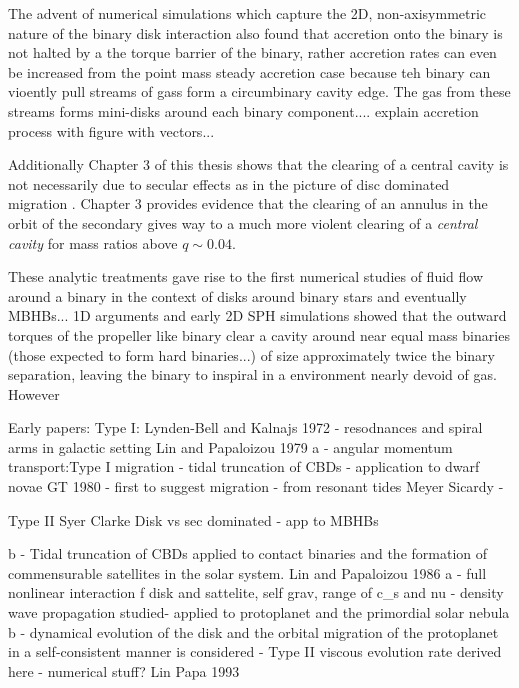 The advent of numerical simulations which capture the 2D, non-axisymmetric
nature of the binary disk interaction also found that accretion onto the
binary is not halted by a the torque barrier of the binary, rather accretion
rates can even be increased from the point mass steady accretion case because
teh binary can vioently pull streams of gass form a circumbinary cavity edge.
The gas from these streams forms mini-disks around each binary component....
explain accretion process with figure with vectors...


Additionally Chapter 3 of this thesis shows that the clearing of a central
cavity is not necessarily due to secular effects as in the picture of disc
dominated migration \cite{SyerClarke:1995}. Chapter 3 provides evidence that
the clearing of an annulus in the orbit of the secondary gives way to a much
more violent clearing of a \emph{central cavity} for mass ratios above $q
\sim0.04$.




These analytic treatments gave rise to the first numerical studies of fluid flow around a binary in the context of disks around binary stars and eventually MBHBs...
1D arguments \citep{SyerClarke, Ivanov?} and early 2D SPH simulations \citep{Artymowicz:1991} showed that the outward torques of the propeller like binary clear a cavity around near equal mass binaries (those expected to form hard binaries...) of size approximately twice the binary separation, leaving the binary to inspiral in a environment nearly devoid of gas. However 




Early papers: 
	Type I: 
		Lynden-Bell and Kalnajs 1972 - resodnances and spiral arms in galactic setting
		Lin and Papaloizou 1979 a - angular momentum transport:Type I migration - tidal truncation of CBDs - application to dwarf novae
		GT 1980 - first to suggest migration - from resonant tides
		Meyer Sicardy - 


	Type II
		Syer Clarke Disk vs sec dominated - app to MBHBs
		
		b - Tidal truncation of CBDs applied to contact binaries and the formation of commensurable satellites in the solar system.
		Lin and Papaloizou 1986 a - full nonlinear interaction f disk and sattelite, self grav, range of c_s and nu - density wave propagation studied- applied to protoplanet and the primordial solar nebula
		b - dynamical evolution of the disk and the orbital migration of the protoplanet in a self-consistent manner is considered - Type II viscous evolution rate derived here - numerical stuff?
		Lin Papa 1993

